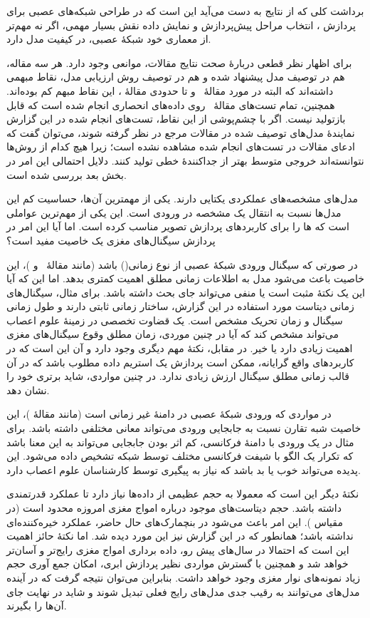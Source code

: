 برداشت کلی که از نتایج به دست می‌آید این است که در طراحی شبکه‌های عصبی برای پردازش ، انتخاب مراحل پیش‌پردازش و نمایش داده نقش بسیار مهمی، اگر نه مهم‌تر از معماری خود شبکهٔ عصبی، در کیفیت مدل دارد.

برای اظهار نظر قطعی دربارهٔ صحت نتایج مقالات، موانعی وجود دارد. هر سه مقاله، هم در توصیف مدل پیشنهاد شده و هم در توصیف روش ارزیابی مدل، نقاط مبهمی داشته‌اند که البته در مورد مقالهٔ \آ\ و تا حدودی مقالهٔ \ب، این نقاط مبهم کم بوده‌اند. همچنین، تمام تست‌های مقالهٔ \ب\ روی داده‌های انحصاری انجام شده است که قابل بازتولید نیست. اگر با چشم‌پوشی از این نقاط، تست‌های انجام شده در این گزارش نمایندهٔ مدل‌های توصیف شده در مقالات مرجع در نظر گرفته شوند، می‌توان گفت که ادعای مقالات در تست‌های انجام شده مشاهده نشده است؛ زیرا هیچ کدام از روش‌ها نتوانسته‌اند خروجی متوسط بهتر از جداکنندهٔ خطی تولید کنند. دلایل احتمالی این امر در بخش بعد بررسی شده است.

مدل‌های  مشخصه‌های عملکردی یکتایی دارند. یکی از مهمترین آن‌ها، حساسیت کم این مدل‌ها نسبت به انتقال یک مشخصه در ورودی است. این یکی از مهم‌ترین عواملی است که ها را برای کاربردهای پردازش تصویر مناسب کرده است. اما آیا این امر در پردازش سیگنال‌های مغزی یک خاصیت مفید است؟

در صورتی که سیگنال ورودی شبکهٔ عصبی از نوع زمانی() باشد (مانند مقالهٔ \آ\ و \پ)، این خاصیت باعث می‌شود مدل به اطلاعات زمانی مطلق اهمیت کمتری بدهد. اما این که آیا این یک نکتهٔ مثبت است یا منفی می‌تواند جای بحث داشته باشد. برای مثال، سیگنال‌های زمانی دیتاست مورد استفاده در این گزارش، ساختار زمانی ثابتی دارند و طول زمانی سیگنال و زمان تحریک مشخص است. یک قضاوت تخصصی در زمینهٔ علوم اعصاب می‌تواند مشخص کند که آیا در چنین موردی، زمان مطلق وقوع سیگنال‌های مغزی اهمیت زیادی دارد یا خیر. در مقابل، نکتهٔ مهم دیگری وجود دارد و آن این است که در کاربردهای واقع گرایانه، ممکن است پردازش یک استریم داده مطلوب باشد که در آن قالب زمانی مطلق سیگنال ارزش زیادی ندارد. در چنین مواردی، شاید  برتری خود را نشان دهد.

در مواردی که ورودی شبکهٔ عصبی در دامنهٔ غیر زمانی است (مانند مقالهٔ \ب)، این خاصیت شبه تقارن  نسبت به جابجایی ورودی می‌تواند معانی مختلفی داشته باشد. برای مثال در یک ورودی با دامنهٔ فرکانسی، کم اثر بودن جابجایی می‌تواند به این معنا باشد که تکرار یک الگو با شیفت فرکانسی مختلف توسط شبکه تشخیص داده می‌شود. این پدیده می‌تواند خوب یا بد باشد که نیاز به پیگیری توسط کارشناسان علوم اعصاب دارد.

نکتهٔ دیگر این است که  معمولا به حجم عظیمی از داده‌ها نیاز دارد تا عملکرد قدرتمندی داشته باشد. حجم دیتاست‌های موجود درباره امواج مغزی امروزه محدود است (در مقیاس ). این امر باعث می‌شود در بنچمارک‌های حال حاضر،  عملکرد خیره‌کننده‌ای نداشته باشد؛ همانطور که در این گزارش نیز این مورد دیده شد. اما نکتهٔ حائز اهمیت این است که احتمالا در سال‌های پیش رو، داده برداری امواج مغزی رایج‌تر و آسان‌تر خواهد شد و همچنین با گسترش مواردی نظیر پردازش ابری، امکان جمع آوری حجم زیاد نمونه‌های نوار مغزی وجود خواهد داشت. بنابراین می‌توان نتیجه گرفت که در آینده مدل‌های  می‌توانند به رقیب جدی مدل‌های رایج فعلی تبدیل شوند و شاید در نهایت جای آن‌ها را بگیرند.


